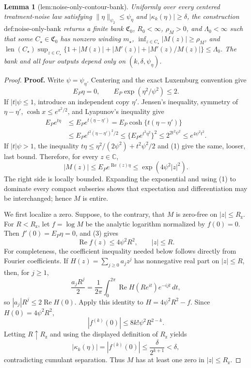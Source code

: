 \documentclass{article}
\newtheorem{lemma}{Lemma}
\begin{document}
\begin{lemma}[lem:noise-only-contour-bank]\label{lem:noise-only-contour-bank}
Uniformly over every centered treatment-noise law satisfying \(\|\eta\|_{\psi_2}\le\psi_\eta\) and \(|\kappa_k(\eta)|\ge\delta\), the construction \(\text{def:noise-only-bank}\) returns a finite bank \(\mathfrak C_0\), \(R_0<\infty\), \(\rho_M>0\), and \(\Lambda_0<\infty\) such that some \(C_\star\in\mathfrak C_0\) has nonzero winding \(m_\star\), \(\inf_{z\in C_\star}|M(z)|\ge\rho_M\), and \(\operatorname{len}(C_\star)\sup_{z\in C_\star}\{1+|M(z)|+|M'(z)|+|M'(z)/M(z)|\}\le\Lambda_0\). The bank and all four outputs depend only on \((k,\delta,\psi_\eta)\).
\end{lemma}
\begin{proof}
\textbf{Proof.}
Write \(\psi=\psi_\eta\).  Centering and the exact Luxemburg convention give
\[
 E_P\eta=0,
 \qquad E_P\exp(\eta^2/\psi^2)\le2. \tag{1}
\]
If \(|t|\psi\le1\), introduce an independent copy \(\eta'\).  Jensen's inequality, symmetry of \(\eta-\eta'\), \(\cosh x\le e^{x^2/2}\), and Lyapunov's inequality give
\[
 \begin{aligned}
 E_Pe^{t\eta}
 &\le E_Pe^{t(\eta-\eta')}
 =E_P\cosh\{t(\eta-\eta')\}\\
 &\le E_Pe^{t^2(\eta-\eta')^2/2}
 \le \{E_Pe^{t^2\eta^2}\}^2
 \le 2^{2t^2\psi^2}
 \le e^{4\psi^2t^2}.
 \end{aligned} \tag{2}
\]
If \(|t|\psi>1\), the inequality \(t\eta\le \eta^2/(2\psi^2)+t^2\psi^2/2\) and (1) give the same, looser, last bound.  Therefore, for every \(z\in\mathbb C\),
\[
 |M(z)|\le E_Pe^{\operatorname{Re}(z)\eta}
 \le \exp(4\psi^2|z|^2). \tag{3}
\]
The right side is locally bounded.  Expanding the exponential and using (1) to dominate every compact subseries shows that expectation and differentiation may be interchanged; hence \(M\) is entire.

We first localize a zero.  Suppose, to the contrary, that \(M\) is zero-free on \(|z|\le R_{\mathrm z}\).  For \(R<R_{\mathrm z}\), let \(f=\log M\) be the analytic logarithm normalized by \(f(0)=0\).  Then \(f'(0)=E_P\eta=0\), and (3) gives
\[
 \operatorname{Re}f(z)\le4\psi^2R^2,
 \qquad |z|\le R. \tag{4}
\]
For completeness, the coefficient inequality needed below follows directly from Fourier coefficients.  If \(H(z)=\sum_{j\ge0}a_jz^j\) has nonnegative real part on \(|z|\le R\), then, for \(j\ge1\),
\[
 \frac{a_jR^j}{2}
 =\frac1{2\pi}\int_0^{2\pi}\operatorname{Re}H(Re^{it})e^{-ijt}\,dt,
\]
so \(|a_j|R^j\le2\operatorname{Re}H(0)\).  Apply this identity to \(H=4\psi^2R^2-f\).  Since \(H(0)=4\psi^2R^2\),
\[
 |f^{(k)}(0)|\le8k!\psi^2R^{2-k}. \tag{5}
\]
Letting \(R\uparrow R_{\mathrm z}\) and using the displayed definition of \(R_{\mathrm z}\) yields
\[
 |\kappa_k(\eta)|=|f^{(k)}(0)|
 \le \frac{\delta}{2^{k+1}}<\delta, \tag{6}
\]
contradicting cumulant separation.  Thus \(M\) has at least one zero in \(|z|\le R_{\mathrm z}\).


\end{proof}
\end{document}
